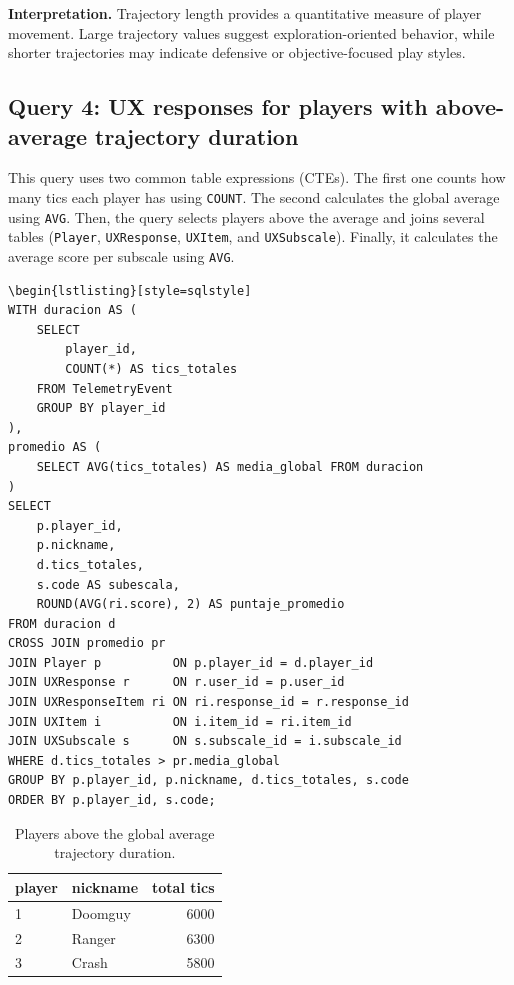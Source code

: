 \documentclass[11pt]{article}
\begin{document}
\textbf{Interpretation.} Trajectory length provides a quantitative measure of player movement. Large trajectory values suggest exploration-oriented behavior, while shorter trajectories may indicate defensive or objective-focused play styles.

\clearpage
\subsection{Query 4: UX responses for players with above-average trajectory duration}
This query uses two common table expressions (CTEs). The first one counts how many tics each player has using \texttt{COUNT}. The second calculates the global average using \texttt{AVG}. Then, the query selects players above the average and joins several tables (\texttt{Player}, \texttt{UXResponse}, \texttt{UXItem}, and \texttt{UXSubscale}). Finally, it calculates the average score per subscale using \texttt{AVG}.

\begin{lstlisting}[style=sqlstyle]
\begin{lstlisting}[style=sqlstyle]
WITH duracion AS (
    SELECT
        player_id,
        COUNT(*) AS tics_totales
    FROM TelemetryEvent
    GROUP BY player_id
),
promedio AS (
    SELECT AVG(tics_totales) AS media_global FROM duracion
)
SELECT
    p.player_id,
    p.nickname,
    d.tics_totales,
    s.code AS subescala,
    ROUND(AVG(ri.score), 2) AS puntaje_promedio
FROM duracion d
CROSS JOIN promedio pr
JOIN Player p          ON p.player_id = d.player_id
JOIN UXResponse r      ON r.user_id = p.user_id
JOIN UXResponseItem ri ON ri.response_id = r.response_id
JOIN UXItem i          ON i.item_id = ri.item_id
JOIN UXSubscale s      ON s.subscale_id = i.subscale_id
WHERE d.tics_totales > pr.media_global
GROUP BY p.player_id, p.nickname, d.tics_totales, s.code
ORDER BY p.player_id, s.code;
\end{lstlisting}

\begin{table}[H]
\centering
\begin{tabular}{llr}
\toprule
\textbf{player} & \textbf{nickname} & \textbf{total tics} \\
\midrule
1 & Doomguy & 6000 \\
2 & Ranger & 6300 \\
3 & Crash & 5800 \\
\bottomrule
\end{tabular}
\caption{Players above the global average trajectory duration.}
\end{table}
\end{document}
